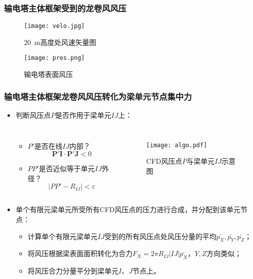 \begin{frame}
  \frametitle{输电塔主体框架受到的龙卷风风压}

  \begin{columnsonlytextwidth}
      \begin{figure}[!htpb]
     \centering
     \texttt{[image: velo.jpg]}
     \caption*{\SI{20}{m}高度处风速矢量图}
     \label{fig:velocity}
   \end{figure}

   \begin{figure}[!htpb]
     \centering
     \texttt{[image: pres.png]}
     \caption*{输电塔表面风压}
     \label{fig:pressure}
   \end{figure}

  \end{columnsonlytextwidth}
  
\end{frame}
\begin{frame}
  \frametitle{输电塔主体框架龙卷风风压转化为梁单元节点集中力}


  \begin{itemize}
  \item 
    判断风压点$P$是否作用于梁单元$IJ$上：
    \begin{columns}
      \begin{itemize}
      \item $P'$是否在线$IJ$内部？
        $$ \bm{P'I}\cdot\bm{P'J} < 0 $$
      \item $PP'$是否近似等于单元$IJ$外径？
        $$ |PP'-R_{IJ}| < \varepsilon $$
      \end{itemize}

      \begin{figure}[!htbp]
        \centering
        \texttt{[image: algo.pdf]}
        \caption*{CFD风压点$P$与梁单元$IJ$示意图}
        \label{fig:algo}
      \end{figure}

    \end{columns}

    \bigskip
  \item
   单个有限元梁单元所受所有CFD风压点的压力进行合成，并分配到该单元节点： 
   \begin{itemize}
   \item 计算单个有限元梁单元$IJ$受到的所有风压点处风压分量的平均$\bar{p_X},\bar{p_Y},\bar{p_Z}$；
	\item 将风压根据梁表面面积转化为合力$F_X=2\pi R_{IJ} |IJ| \bar{p_X}$，$Y,Z$方向类似；
	\item 将风压合力分量平分到梁单元$I$、$J$节点上。
  \end{itemize}
  \end{itemize}
  
\end{frame}

